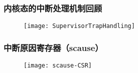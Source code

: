 \begin{frame}
	\frametitle{内核态的中断处理机制回顾}
	\begin{figure}
	\texttt{[image: SupervisorTrapHandling]}
	\end{figure}
\end{frame}
%
%
%
%
%
%
%
%
%
\begin{frame}   
	\frametitle{中断原因寄存器（scause）}
	\begin{figure}
	\texttt{[image: scause-CSR]}
	\end{figure}
\end{frame}
%
